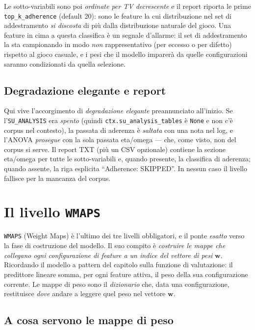 Le sotto-variabili sono poi \emph{ordinate per TV decrescente} e il report
riporta le prime \texttt{top\_k\_adherence} (default 20): sono le feature la
cui distribuzione nel set di addestramento \emph{si discosta} di più dalla
distribuzione naturale del gioco. Una feature in cima a questa classifica è un
segnale d'allarme: il set di addestramento la sta campionando in modo
\emph{non} rappresentativo (per eccesso o per difetto) rispetto al gioco
casuale, e i pesi che il modello imparerà da quelle configurazioni saranno
condizionati da quella selezione.

\subsection{Degradazione elegante e report}

Qui vive l'accorgimento di \emph{degradazione elegante} preannunciato
all'inizio. Se l'\texttt{SU\_ANALYSIS} era \emph{spento} (quindi
\texttt{ctx.su\_analysis\_tables} è \texttt{None} e non c'è corpus nel
contesto), la passata di aderenza è \emph{saltata} con una nota nel log, e
l'ANOVA \emph{prosegue} con la sola passata eta/omega — che, come visto, non
del corpus si serve. Il report TXT (più un CSV opzionale) contiene la sezione
eta/omega per tutte le sotto-variabili e, quando presente, la classifica di
aderenza; quando assente, la riga esplicita
``Adherence: SKIPPED''. In nessun caso il livello fallisce per la mancanza del
corpus.

\section{Il livello \texttt{WMAPS}}
\label{sec:corpus-wmaps}

\texttt{WMAPS} (Weight Maps) è l'ultimo dei tre livelli obbligatori, e il
ponte \emph{esatto} verso la fase di costruzione del modello. Il suo compito è
\emph{costruire le mappe che collegano ogni configurazione di feature a un
indice del vettore di pesi} $\bm{w}$. Ricordando il modello a pattern del
capitolo sulla funzione di valutazione: il predittore lineare somma, per ogni
feature attiva, il peso della sua configurazione corrente. Le mappe di peso
sono il \emph{dizionario} che, data una configurazione, restituisce
\emph{dove} andare a leggere quel peso nel vettore $\bm{w}$.

\subsection{A cosa servono le mappe di peso}

